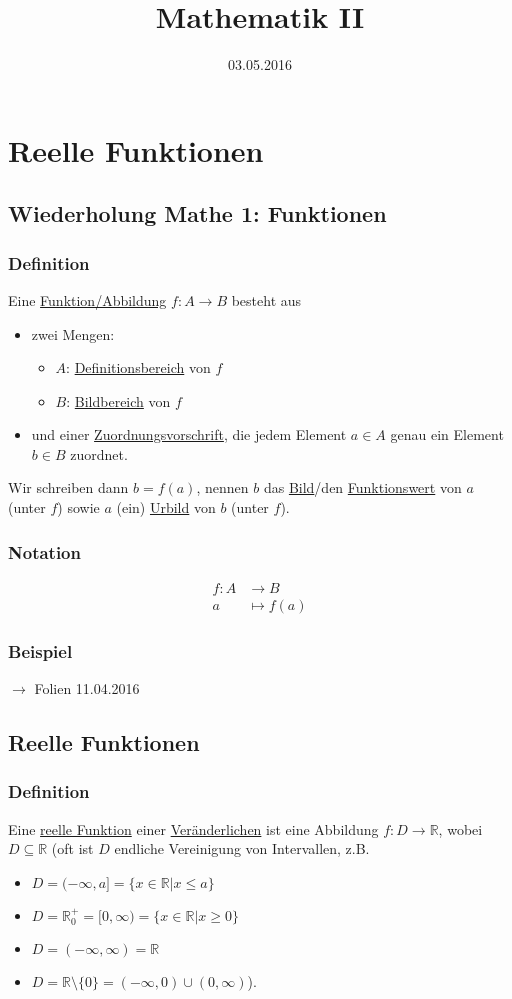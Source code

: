 \documentclass[12pt, titlepage]{article}
\title{Mathematik II}
\date{03.05.2016}
\newcommand{\R}{\mathds{R}}
\renewcommand{\*}{\cdot}
\begin{document}
	\maketitle
	\tableofcontents
	\newpage
	\section{Reelle Funktionen}
	\subsection{Wiederholung Mathe 1: Funktionen}
	\subsubsection*{Definition}
		Eine \underline{Funktion/Abbildung} $f\colon A\rightarrow B$ besteht aus
		\begin{itemize}
			\item zwei Mengen:
			\begin{itemize}
				\item $A$: \underline{Definitionsbereich} von $f$
				\item $B$: \underline{Bildbereich} von $f$
			\end{itemize}
			\item und einer \underline{Zuordnungsvorschrift}, die jedem Element $a\in A$ genau ein Element $b\in B$ zuordnet.
		\end{itemize}
		Wir schreiben dann $b=f(a)$, nennen $b$ das \underline{Bild}/den \underline{Funktionswert} von $a$ (unter $f$) sowie $a$ (ein) \underline{Urbild} von $b$ (unter $f$).
	\subsubsection*{Notation}
		\vspace{-1cm}\begin{align*}
			f\colon A&\rightarrow B\\
			a&\mapsto f(a)
		\end{align*}
	\subsubsection*{Beispiel}
		$\rightarrow$ Folien 11.04.2016
	\subsection{Reelle Funktionen}
	\subsubsection*{Definition}
	Eine \underline{reelle Funktion} einer \underline{Veränderlichen} ist eine Abbildung $f\colon D\rightarrow \R$, wobei $D\subseteq \R$ (oft ist $D$ endliche Vereinigung von Intervallen, z.B.
	\begin{itemize}
		\item $ D=(-\infty,a]=\{x\in \R|x\leq a\} $
		\item $ D=\R^+_0=[0,\infty)=\{x\in\R|x\geq 0\}$
		\item $ D=(-\infty,\infty)=\R $
		\item $ D=\R\setminus\{0\}=(-\infty,0)\cup(0,\infty) $\hfill).
	\end{itemize}
\end{document}
